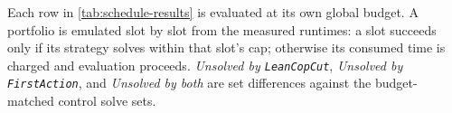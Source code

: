 \documentclass[11pt,twocolumn]{article}
\begin{document}
Each row in \cref{tab:schedule-results} is evaluated at its own global budget.
A portfolio is emulated slot by slot from the measured runtimes: a slot succeeds only if its strategy solves within that slot's cap; otherwise its consumed time is charged and evaluation proceeds.
\emph{Unsolved by \texttt{LeanCopCut}}, \emph{Unsolved by \texttt{FirstAction}}, and \emph{Unsolved by both} are set differences against the budget-matched control solve sets.

\renewcommand*{\bibfont}{\small}
\printbibliography{}
\end{document}
